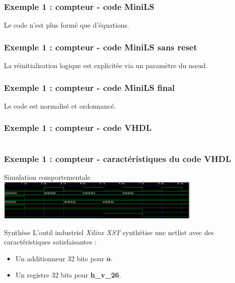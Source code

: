 \documentclass{beamer}
\begin{document}
\begin{frame}
  \frametitle{Exemple 1 : compteur - code MiniLS}

  \footnotesize

  

  Le code n'est plus formé que d'équations.
\end{frame}

\begin{frame}
  \frametitle{Exemple 1 : compteur - code MiniLS sans reset}

  \footnotesize

  

  La réinitialisation logique est explicitée via un paramètre du nœud.
\end{frame}

\begin{frame}
  \frametitle{Exemple 1 : compteur - code MiniLS final}

  \footnotesize

  

  Le code est normalisé et ordonnancé.
\end{frame}

\begin{frame}
  \frametitle{Exemple 1 : compteur - code VHDL}

  \tiny

  \begin{columns}[t]
    \hspace{1cm}
    \begin{column}{6cm}
      
    \end{column}
    \begin{column}{6cm}
      
    \end{column}
  \end{columns}
\end{frame}

\begin{frame}
  \frametitle{Exemple 1 : compteur - caractéristiques du code VHDL}

  \begin{block}{Simulation comportementale}
    \vspace{0.3cm}
    \includegraphics[width=10cm]{capture-chrono-compteur}
  \end{block}

  \begin{block}{Synthèse}
    L'outil industriel \textit{Xilinx XST} synthétise une netlist avec des
    caractéristiques satisfaisantes :

    \begin{itemize}
    \item Un additionneur 32 bits pour \textbf{o}.
    \item Un registre 32 bits pour \textbf{h\_v\_26}.
    \end{itemize}
  \end{block}
\end{frame}
\end{document}
